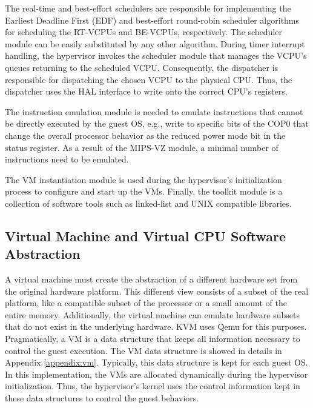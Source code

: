 The real-time and best-effort schedulers are responsible for implementing the Earliest Deadline First (EDF) and best-effort round-robin scheduler algorithms for scheduling the RT-VCPUs and BE-VCPUs, respectively. The scheduler module can be easily substituted by any other algorithm. During timer interrupt handling, the hypervisor invokes the scheduler module that manages the VCPU's queues returning to the scheduled VCPU. Consequently, the dispatcher is responsible for dispatching the chosen VCPU to the physical CPU. Thus, the dispatcher uses the HAL interface to write onto the correct CPU's registers. 

The instruction emulation module is needed to emulate instructions that cannot be directly executed by the guest OS, e.g., write to specific bits of the COP0 that change the overall processor behavior as the reduced power mode bit in the status register. As a result of the MIPS-VZ module, a minimal number of instructions need to be emulated. %

The VM instantiation module is used during the hypervisor's initialization process to configure and start up the VMs. Finally, the toolkit module is a collection of software tools such as linked-list and UNIX compatible libraries. 

\subsection{Virtual Machine and Virtual CPU Software Abstraction}
\label{chapter5:vcpu_abstration}

A virtual machine must create the abstraction of a different hardware set from the original hardware platform. This different view consists of a subset of the real platform, like a compatible subset of the processor or a small amount of the entire memory. Additionally, the virtual machine can emulate hardware subsets that do not exist in the underlying hardware. KVM uses Qemu for this purposes. Pragmatically, a VM is a data structure that keeps all information necessary to control the guest execution. The VM data structure is showed in details in Appendix \ref{appendix:vm}. Typically, this data structure is kept for each guest OS. In this implementation, the VMs are allocated dynamically during the hypervisor initialization. Thus, the hypervisor's kernel uses the control information kept in these data structures to control the guest behaviors. 

